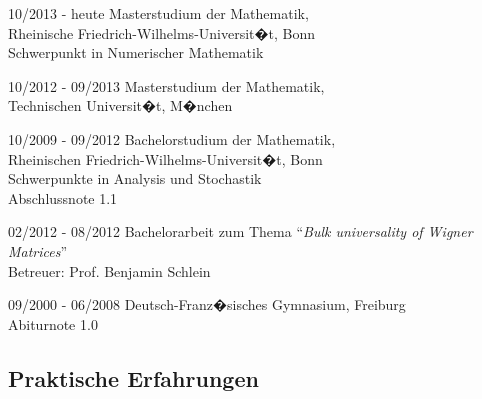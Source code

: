 \documentclass[a4papers]{scrartcl}
\begin{document}
\begin{list}{}
{\setlength{\topsep}{1.0cm}
\setlength{\itemsep}{0cm}
\setlength{\leftmargin}{3.6cm}
\setlength{\labelwidth}{3.2cm}
\setlength{\labelsep}{0.4cm}
\renewcommand{\makelabel}[1]{\fontfamily{cmss}\fontseries{x}\fontshape{n}
\selectfont #1}}
\item[10/2013 - heute] Masterstudium der Mathematik, \\
  Rheinische Friedrich-Wilhelms-Universit�t, Bonn \\
  Schwerpunkt in Numerischer Mathematik
\item[10/2012 - 09/2013] Masterstudium der Mathematik, \\
  Technischen Universit�t, M�nchen
\item[10/2009 - 09/2012] Bachelorstudium der Mathematik, \\
  Rheinischen Friedrich-Wilhelms-Universit�t, Bonn \\
  Schwerpunkte in Analysis und Stochastik \\
  Abschlussnote 1.1
\item[02/2012 - 08/2012] Bachelorarbeit zum Thema ``\textit{Bulk universality of
    Wigner Matrices}'' \\
  Betreuer: Prof. Benjamin Schlein
\item[09/2000 - 06/2008] Deutsch-Franz�sisches Gymnasium, Freiburg \\
  Abiturnote 1.0
\end{list}


\vspace{-2.5\baselineskip}
\subsection{Praktische Erfahrungen}
\end{document}
